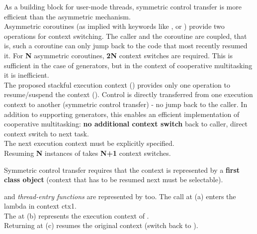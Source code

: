 As a building block for user-mode threads, symmetric control transfer is more
efficient than the asymmetric mechanism.\\
\newline
Asymmetric coroutines (as implied with keywords like \resumable, \await or
\yield) provide two operations for context switching. The caller and the
coroutine are coupled, that is, such a coroutine can only jump back to the code
that most recently resumed it.
For {\bfseries N} asymmetric coroutines, {\bfseries 2N} context switches are
required. This is sufficient in the case of generators, but in the context of
cooperative multitasking it is inefficient.\\
\newline
The proposed stackful execution context (\ectx) provides only one operation to
resume/suspend the context (\op). Control is directly transferred from one
execution context to another (symmetric control transfer) - no jump back to
the caller. In addition to supporting generators, this enables an efficient
implementation of cooperative multitasking: {\bfseries no additional context
switch} back to caller, direct context switch to next task.\\
The next execution context must be explicitly specified.\\
\newline
{}
Resuming {\bfseries N} instances of \ectx takes {\bfseries N+1} context
switches.

Symmetric control transfer requires that the context is represented by a
{\bfseries first class object} (context that has to be resumed next must be
selectable).

\main and \emph{thread-entry functions} are represented by \ectx too.
The  call at (a) enters the lambda in context ctx1.\\
The \ectx {} at (b) represents the execution context of \main.\\
Returning  at (c) resumes the original context (switch back to
\main).


